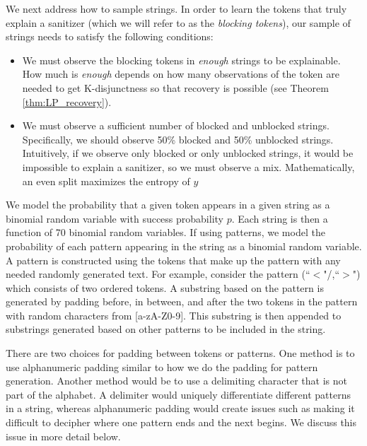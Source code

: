 We next address how to sample strings. In order to learn the tokens that truly explain a sanitizer (which we will refer to as the \emph{blocking tokens}), our sample of strings needs to satisfy the following conditions: 
\begin{itemize}
	\item We must observe the blocking tokens in \emph{enough} strings to be explainable. How much is \emph{enough} depends on how many observations of the token are needed to get K-disjunctness so that recovery is possible (see Theorem \ref{thm:LP_recovery}). 
	\item We must observe a sufficient number of blocked and unblocked strings. Specifically, we should observe 50\% blocked and 50\% unblocked strings. Intuitively, if we observe only blocked or only unblocked strings, it would be impossible to explain a sanitizer, so we must observe a mix. Mathematically, an even split maximizes the entropy of $y$	
\end{itemize} 
We model the probability that a given token appears in a given string as a binomial random variable with success probability $p$. Each string is then a function of 70 binomial random variables. If using patterns, we model the probability of each pattern appearing in the string as a binomial random variable. A pattern is constructed using the tokens that make up the pattern with any needed randomly generated text.  For example, consider the pattern (``$<$"/,``$>$") which consists of two ordered tokens. A substring based on the pattern is generated by padding before, in between, and after the two tokens in the pattern with random characters from [a-zA-Z0-9]. This substring is then appended to substrings generated based on other patterns to be included in the string. 

There are two choices for padding between tokens or patterns. One method is to use alphanumeric padding similar to how we do the padding for pattern generation. Another method would be to use a delimiting character that is not part of the alphabet. A delimiter would uniquely differentiate different patterns in a string, whereas alphanumeric padding would create issues such as making it difficult to decipher where one pattern ends and the next begins. We discuss this issue in more detail below.

